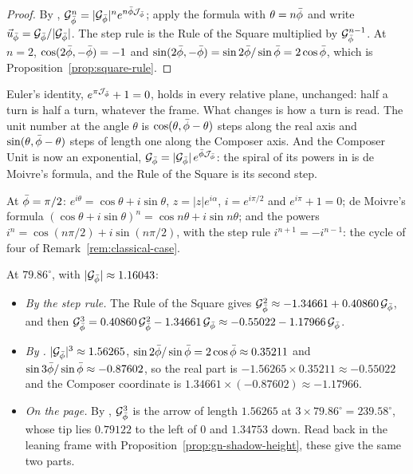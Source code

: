 \begin{proof}
By , $\mathcal{G}_{\bar{\phi}}^n = |\mathcal{G}_{\bar{\phi}}|^n e^{n\bar{\phi}\mathcal{J}_{\bar{\phi}}}$; apply the formula with $\theta = n\bar{\phi}$ and write $\vec{u}_{\bar{\phi}} = \mathcal{G}_{\bar{\phi}}/|\mathcal{G}_{\bar{\phi}}|$. The step rule is the Rule of the Square multiplied by $\mathcal{G}_{\bar{\phi}}^{n-1}$. At $n = 2$, $\cos(2\bar{\phi}, -\bar{\phi}) = -1$ and $\sin(2\bar{\phi}, -\bar{\phi}) = \sin 2\bar{\phi}/\sin\bar{\phi} = 2\cos\bar{\phi}$, which is Proposition~\ref{prop:square-rule}.
\end{proof}

\begin{plainwords}
Euler's identity, $e^{\pi\mathcal{J}_{\bar{\phi}}} + 1 = 0$, holds in every relative plane, unchanged: half a turn is half a turn, whatever the frame. What changes is how a turn is read. The unit number at the angle $\theta$ is $\cos(\theta, \bar{\phi} - \theta)$ steps along the real axis and $\sin(\theta, \bar{\phi} - \theta)$ steps of length one along the Composer axis. And the Composer Unit is now an exponential, $\mathcal{G}_{\bar{\phi}} = |\mathcal{G}_{\bar{\phi}}|\,e^{\bar{\phi}\mathcal{J}_{\bar{\phi}}}$: the spiral of its powers in  is de Moivre's formula, and the Rule of the Square is its second step.
\end{plainwords}

\incomplex At $\bar{\phi} = \pi/2$: $e^{i\theta} = \cos\theta + i\sin\theta$, $z = |z|e^{i\alpha}$, $i = e^{i\pi/2}$ and $e^{i\pi} + 1 = 0$; de Moivre's formula $(\cos\theta + i\sin\theta)^n = \cos n\theta + i\sin n\theta$; and the powers $i^n = \cos(n\pi/2) + i\sin(n\pi/2)$, with the step rule $i^{n+1} = -i^{n-1}$: the cycle of four of Remark~\ref{rem:classical-case}.

\begin{workedexample}
At $79.86^\circ$, with $|\mathcal{G}_{\bar{\phi}}| \approx 1.16043$:
\begin{itemize}
  \item \emph{By the step rule.} The Rule of the Square gives $\mathcal{G}_{\bar{\phi}}^2 \approx -1.34661 + 0.40860\,\mathcal{G}_{\bar{\phi}}$, and then $\mathcal{G}_{\bar{\phi}}^3 = 0.40860\,\mathcal{G}_{\bar{\phi}}^2 - 1.34661\,\mathcal{G}_{\bar{\phi}} \approx -0.55022 - 1.17966\,\mathcal{G}_{\bar{\phi}}$.
  \item \emph{By .} $|\mathcal{G}_{\bar{\phi}}|^3 \approx 1.56265$, $\sin 2\bar{\phi}/\sin\bar{\phi} = 2\cos\bar{\phi} \approx 0.35211$ and $\sin 3\bar{\phi}/\sin\bar{\phi} \approx -0.87602$, so the real part is $-1.56265 \times 0.35211 \approx -0.55022$ and the Composer coordinate is $1.34661 \times (-0.87602) \approx -1.17966$.
  \item \emph{On the page.} By , $\mathcal{G}_{\bar{\phi}}^3$ is the arrow of length $1.56265$ at $3 \times 79.86^\circ = 239.58^\circ$, whose tip lies $0.79122$ to the left of $0$ and $1.34753$ down. Read back in the leaning frame with Proposition~\ref{prop:gn-shadow-height}, these give the same two parts.
\end{itemize}
\end{workedexample}

